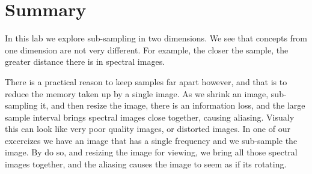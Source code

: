 \section{Summary}

In this lab we explore sub-sampling in two dimensions. We see that concepts from
one dimension are not very different. For example, the closer the sample, the
greater distance there is in spectral images. 

There is a practical reason to keep samples far apart however, and that is to
reduce the memory taken up by a single image. As we shrink an image,
sub-sampling it, and then resize the image, there is an information loss, and
the large sample interval brings spectral images close together, causing
aliasing. Visualy this can look like very poor quality images, or distorted
images. In one of our excercizes we have an image that has a single frequency
and we sub-sample the image. By do so, and resizing the image for viewing, we
bring all those spectral images together, and the aliasing causes the image to
seem as if its rotating.

